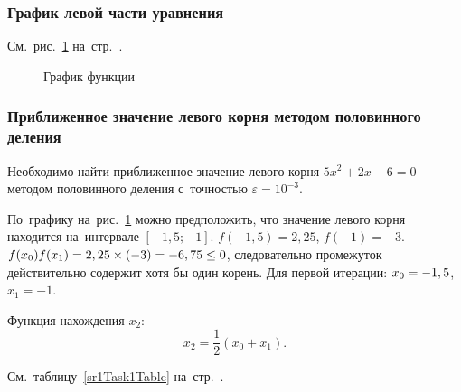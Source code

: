 \documentclass[10pt, a4paper, titlepage, oneside]{article}
\newcommand*\hm[1]{#1\nobreak\discretionary{}{\hbox{$\mathsurround=0pt #1$}}{}} %
\begin{document}
\subsubsection*{График левой части уравнения}

См.~рис.~\ref{sr1Task1Function} на~стр.~\pageref{sr1Task1Function}.

\begin{figure}[htb]
    \centering
    \caption{График функции}
    \label{sr1Task1Function}
\end{figure}

\subsubsection*{Приближенное значение левого корня методом половинного деления}

Необходимо найти приближенное значение левого корня $5x^2+2x-6=0$ методом половинного деления с~точностью $\varepsilon=10^{-3}$.

По~графику на~рис.~\ref{sr1Task1Function} можно предположить, что значение левого корня находится на~интервале $[-1,5;-1]$. $f(-1,5)=2,25$, $f(-1)=-3$. $f(x_0)f(x_1) \hm =2,25\times(-3)=-6,75\leq0$, следовательно промежуток действительно содержит хотя бы один корень. Для первой итерации: $x_0\hm=-1,5$, $x_1=-1$.

Функция нахождения $x_2$:
$$x_2=\frac{1}{2}(x_0+x_1).$$

См.~таблицу~\ref{sr1Task1Table} на~стр.~\pageref{sr1Task1Table}.
\end{document}

